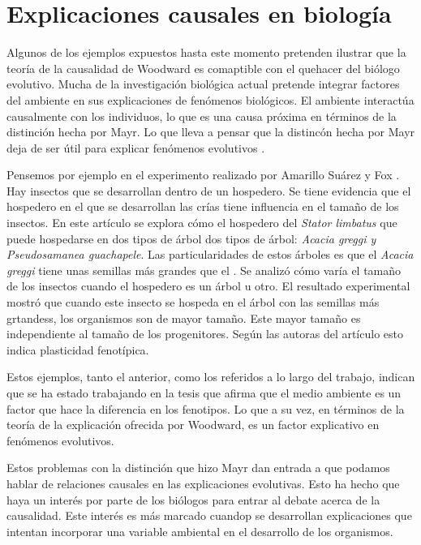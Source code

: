 \section{Explicaciones causales en biología}

Algunos de los ejemplos expuestos hasta este momento pretenden ilustrar que la teoría de la causalidad de Woodward es comaptible con el quehacer del biólogo evolutivo. Mucha de la investigación biológica actual pretende integrar factores del ambiente en sus explicaciones de fenómenos biológicos. El ambiente interactúa causalmente con los individuos, lo que es una causa próxima en términos de la distinción hecha por Mayr. Lo que lleva a pensar que la distincón hecha por Mayr deja de ser útil para explicar fenómenos evolutivos \cite{Uller2020, Dayan2020, Laland2011}.

Pensemos por ejemplo en el experimento realizado por Amarillo Suárez y Fox \citeyear{Amarillo-Suarez2006}. Hay insectos que se desarrollan dentro de un hospedero. Se tiene evidencia que el hospedero en el que se desarrollan las crías tiene influencia en el tamaño de los insectos. En este artículo se explora cómo el hospedero del \emph{Stator limbatus} que puede hospedarse en dos tipos de árbol  dos tipos de árbol: \emph{Acacia greggi y Pseudosamanea guachapele}. Las particularidades de estos árboles es que el \emph{Acacia greggi} tiene unas semillas más grandes que el . Se analizó cómo varía el tamaño de los insectos cuando el hospedero es un árbol u otro. El resultado experimental mostró que cuando este insecto se hospeda en el árbol con las semillas más grtandess, los organismos son de mayor tamaño. Este mayor tamaño es independiente al tamaño de los progenitores. Según las autoras del artículo esto indica plasticidad fenotípica.

Estos ejemplos, tanto el anterior, como los referidos a lo largo del trabajo, indican que se ha estado trabajando en la tesis que afirma que el medio ambiente es un factor que hace la diferencia en los fenotipos. Lo que a su vez, en términos de la teoría de la explicación ofrecida por Woodward, es un factor explicativo en fenómenos evolutivos.



Estos problemas con la distinción que hizo Mayr dan entrada a que podamos hablar de relaciones causales en las explicaciones evolutivas. Esto ha hecho que haya un interés por parte de los biólogos para entrar al debate acerca de la causalidad. Este interés es más marcado cuandop se desarrollan explicaciones que intentan incorporar una variable ambiental en el desarrollo de los organismos.




